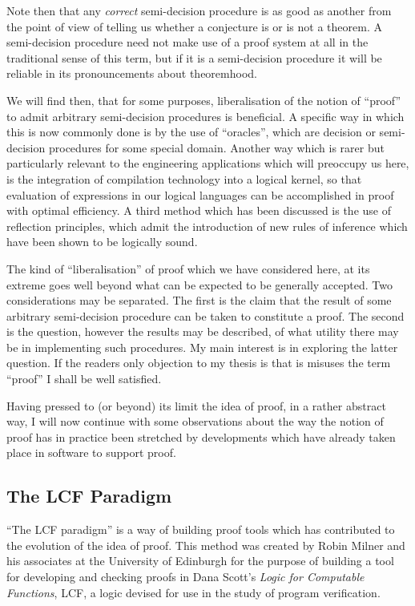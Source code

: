 Note then that any {\it correct} semi-decision procedure is as good as another from the point of view of telling us whether a conjecture is or is not a theorem.
A semi-decision procedure need not make use of a proof system at all in the traditional sense of this term, but if it is a semi-decision procedure it will be reliable in its pronouncements about theoremhood.

We will find then, that for some purposes, liberalisation of the notion of ``proof'' to admit arbitrary semi-decision procedures is beneficial.
A specific way in which this is now commonly done is by the use of ``oracles'', which are decision or semi-decision procedures for some special domain.
Another way which is rarer but particularly relevant to the engineering applications which will preoccupy us here, is the integration of compilation technology into a logical kernel, so that evaluation of expressions in our logical languages can be accomplished in proof with optimal efficiency.
A third method which has been discussed is the use of reflection principles, which admit the introduction of new rules of inference which have been shown to be logically sound.
 
The kind of ``liberalisation'' of proof which we have considered here, at its extreme goes well beyond what can be expected to be generally accepted.
Two considerations may be separated.
The first is the claim that the result of some arbitrary semi-decision procedure can be taken to constitute a proof.
The second is the question, however the results may be described, of what utility there may be in implementing such procedures.
My main interest is in exploring the latter question.
If the readers only objection to my thesis is that is misuses the term ``proof'' I shall be well satisfied.

Having pressed to (or beyond) its limit the idea of proof, in a rather abstract way, I will now continue with some observations about the way the notion of proof has in practice been stretched by developments which have already taken place in software to support proof.

\subsection{The LCF Paradigm}

``The LCF paradigm'' is a way of building proof tools which has contributed to the evolution of the idea of proof.
This method was created by Robin Milner and his associates at the University of Edinburgh for the purpose of building a tool for developing and checking proofs in Dana Scott's {\it Logic for Computable Functions}, LCF, a logic devised for use in the study of program verification.

